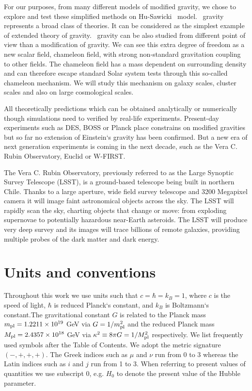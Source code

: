 For our purposes, from many different models of modified gravity, we chose to explore and test these simplified methods on Hu-Sawicki \fR\ model. \fR\ gravity represents a broad class of theories. It can be considered as the simplest example of extended theory of gravity. \fR\ gravity can be also studied from different point of view than a modification of gravity. We can see this extra degree of freedom as a new scalar field, chameleon field, with strong non-standard gravitation coupling to other fields. The chameleon field has a mass dependent on surrounding density and can therefore escape standard Solar system tests through this so-called chameleon mechanism. We will study this mechanism on galaxy scales, cluster scales and also on large cosmological scales.

All theoretically predictions which can be obtained analytically or numerically though simulations need to verified by real-life experiments. Present-day experiments such as DES, BOSS or Planck place constrains on modified gravities but so far no extension of Einstein`s gravity has been confirmed. But a new era of next generation experiments is coming in the next decade, such as the Vera C. Rubin Observatory, Euclid or W-FIRST.

The Vera C. Rubin Observatory, previously referred to as the Large Synoptic Survey Telescope (LSST), is a ground-based telescope being built in northern Chile. Thanks to a large aperture, wide field survey telescope and 3200 Megapixel camera it will image faint astronomical objects across the sky. The LSST will rapidly scan the sky, charting objects that change or move: from exploding supernovae to potentially hazardous near-Earth asteroids. The LSST will produce very deep survey and its images will trace billions of remote galaxies, providing multiple probes of the dark matter and dark energy.


\section*{Units and conventions}

Throughout this work we use units such that $c=\hbar=k_B=1$, where $c$ is the speed of light, $\hbar$ is reduced Planck`s constant, and $k_B$ is Boltzmann`s constant.The gravitational constant $G$ is related to the Planck mass $m_{\text{\scriptsize pl}}=1.2211\times10^{19}$ GeV via $G=1/m_{\text{\scriptsize pl}}^2$ and the reduced Planck mass $M_{\text{\scriptsize pl}} = 2.4357\times10^{18}$ GeV via $\kappa^2\equiv8\pi G=1/M_{\text{\scriptsize pl}}^2$ respectively. We list frequently used symbols after the Table of Contents. We adopt the metric signature $(-, +, +, +)$. The Greek indices such as $\mu$ and $\nu$ run from 0 to 3 whereas the Latin indices such as $i$ and $j$ run from 1 to 3. When referring to present values of quantities we use subscript $0$, e.g. $H_0$ to denote the present value of the Hubble parameter.